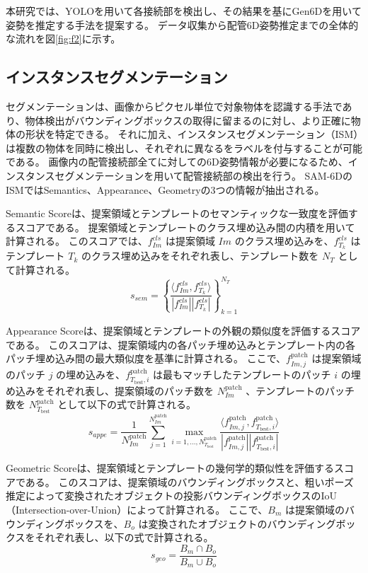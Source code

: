 本研究では、YOLOを用いて各接続部を検出し、その結果を基にGen6Dを用いて姿勢を推定する手法を提案する。
データ収集から配管6D姿勢推定までの全体的な流れを図\ref{fig:f2}に示す。

\subsection{インスタンスセグメンテーション}
セグメンテーションは、画像からピクセル単位で対象物体を認識する手法であり、物体検出がバウンディングボックスの取得に留まるのに対し、より正確に物体の形状を特定できる。
それに加え、インスタンスセグメンテーション（ISM）は複数の物体を同時に検出し、それぞれに異なるをラベルを付与することが可能である。
画像内の配管接続部全てに対しての6D姿勢情報が必要になるため、インスタンスセグメンテーションを用いて配管接続部の検出を行う。
SAM-6DのISMではSemantics、Appearance、Geometryの3つの情報が抽出される。

Semantic Scoreは、提案領域とテンプレートのセマンティックな一致度を評価するスコアである。
提案領域とテンプレートのクラス埋め込み間の内積を用いて計算される。
このスコアでは、$f^{cls}_{Im}$ は提案領域 $Im$ のクラス埋め込みを、$f^{cls}_{T_k}$ はテンプレート $T_k$ のクラス埋め込みをそれぞれ表し、テンプレート数を $N_T$ として計算される。
\[
s_{sem} = \left\{ \frac{\langle f^{cls}_{Im}, f^{cls}_{T_k} \rangle}{|f^{cls}_{Im}||f^{cls}_{T_k}|} \right\}_{k=1}^{N_T}
\]

Appearance Scoreは、提案領域とテンプレートの外観の類似度を評価するスコアである。
このスコアは、提案領域内の各パッチ埋め込みとテンプレート内の各パッチ埋め込み間の最大類似度を基準に計算される。
ここで、$f^{\text{patch}}_{Im,j}$ は提案領域のパッチ $j$ の埋め込みを、$f^{\text{patch}}_{T_{\text{best}},i}$ は最もマッチしたテンプレートのパッチ $i$ の埋め込みをそれぞれ表し、提案領域のパッチ数を $N_{Im}^{\text{patch}}$ 、テンプレートのパッチ数を $N_{T_{\text{best}}}^{\text{patch}}$ として以下の式で計算される。
\[
s_{appe} = \frac{1}{N_{Im}^{\text{patch}}} \sum_{j=1}^{N_{Im}^{\text{patch}}} \max_{i=1, \dots, N_{T_{\text{best}}}^{\text{patch}}} \frac{\langle f^{\text{patch}}_{Im,j}, f^{\text{patch}}_{T_{\text{best}},i} \rangle}{|f^{\text{patch}}_{Im,j}| |f^{\text{patch}}_{T_{\text{best}},i}|}
\]

Geometric Scoreは、提案領域とテンプレートの幾何学的類似性を評価するスコアである。
このスコアは、提案領域のバウンディングボックスと、粗いポーズ推定によって変換されたオブジェクトの投影バウンディングボックスのIoU（Intersection-over-Union）によって計算される。
ここで、$B_m$ は提案領域のバウンディングボックスを、$B_o$ は変換されたオブジェクトのバウンディングボックスをそれぞれ表し、以下の式で計算される。
\[
s_{geo} = \frac{B_m \cap B_o}{B_m \cup B_o}
\]

